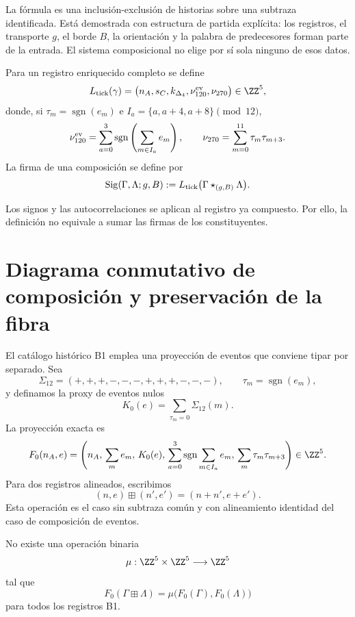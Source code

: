 La fórmula es una inclusión-exclusión de historias sobre una subtraza
identificada. Está demostrada con estructura de partida explícita: los
registros, el transporte \(g\), el borde \(B\), la orientación y la palabra
de predecesores forman parte de la entrada. El sistema composicional no elige por
sí sola ninguno de esos datos.

\begin{definition}
\label{def:extractor-posterior-empalme-rev6}
Para un registro enriquecido completo se define
\[
 L_{\rm tick}(\gamma)
 =
 \bigl(
 n_A,s_C,k_{\Delta_4},
 \nu_{120}^{\rm ev},\nu_{270}
 \bigr)\in\ZZ^5,
\]
donde, si \(\tau_m=\operatorname{sgn}(e_m)\) e
\(I_a=\{a,a+4,a+8\}\pmod {12}\),
\[
 \nu_{120}^{\rm ev}
 =
 \sum_{a=0}^{3}
 \operatorname{sgn}\left(\sum_{m\in I_a}e_m\right),
 \qquad
 \nu_{270}
 =
 \sum_{m=0}^{11}\tau_m\tau_{m+3}.
\]
La firma de una composición se define por
\[
 \operatorname{Sig}(\Gamma,\Lambda;g,B)
 :=
 L_{\rm tick}
 \bigl(\Gamma\star_{(g,B)}\Lambda\bigr).
\]
\end{definition}

Los signos y las autocorrelaciones se aplican al registro ya compuesto. Por
ello, la definición no equivale a sumar las firmas de los constituyentes.

\section{Diagrama conmutativo de composición y preservación de la fibra}
\label{sec:rombo-no-descenso-composicional-rev6}

El catálogo histórico B1 emplea una proyección de eventos que conviene
tipar por separado. Sea
\[
 \Sigma_{12}=(+,+,+,-,-,-,+,+,+,-,-,-),
 \qquad \tau_m=\operatorname{sgn}(e_m),
\]
y definamos la proxy de eventos nulos
\[
 K_0(e)
 =
 \sum_{\tau_m=0}\Sigma_{12}(m).
\]
La proyección exacta es
\[
 F_0(n_A,e)
 =
 \left(
 n_A,\,
 \sum_m e_m,\,
 K_0(e),\,
 \sum_{a=0}^{3}
   \operatorname{sgn}\sum_{m\in I_a}e_m,\,
 \sum_m\tau_m\tau_{m+3}
 \right)\in\ZZ^5.
\]
Para dos registros alineados, escribimos
\[
 (n,e)\boxplus(n',e')=(n+n',e+e').
\]
Esta operación es el caso sin subtraza común y con alineamiento identidad del
caso de composición de eventos.

\begin{proposition}
\label{prop:no-descenso-proyeccion-b1-rev6}
No existe una operación binaria
\[
 \mu:\ZZ^5\times\ZZ^5\longrightarrow\ZZ^5
\]
tal que
\[
 F_0(\Gamma\boxplus\Lambda)
 =
 \mu\bigl(F_0(\Gamma),F_0(\Lambda)\bigr)
\]
para todos los registros B1.
\end{proposition}

